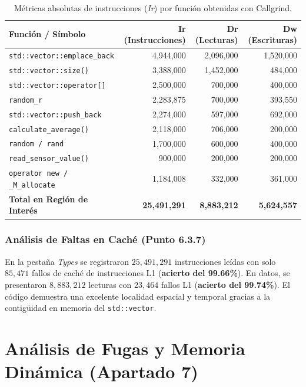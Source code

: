 \documentclass[11pt,a4paper]{article}
\begin{document}
\begin{table}[H]
\centering
\caption{Métricas absolutas de instrucciones (\textit{Ir}) por función obtenidas con Callgrind.}
\label{tab:callgrind_metrics}
\begin{tabular}{lrrr}
\toprule
\textbf{Función / Símbolo} & \textbf{Ir (Instrucciones)} & \textbf{Dr (Lecturas)} & \textbf{Dw (Escrituras)} \\ \midrule
\texttt{std::vector::emplace\_back} & 4,944,000 & 2,096,000 & 1,520,000 \\
\texttt{std::vector::size()} & 3,388,000 & 1,452,000 & 484,000 \\
\texttt{std::vector::operator[]} & 2,500,000 & 700,000 & 400,000 \\
\texttt{random\_r} & 2,283,875 & 700,000 & 393,550 \\
\texttt{std::vector::push\_back} & 2,274,000 & 597,000 & 692,000 \\
\texttt{calculate\_average()} & 2,118,000 & 706,000 & 200,000 \\
\texttt{random / rand} & 1,700,000 & 600,000 & 400,000 \\
\texttt{read\_sensor\_value()} & 900,000 & 200,000 & 200,000 \\
\texttt{operator new / \_M\_allocate} & 1,184,008 & 332,000 & 361,000 \\ \midrule
\textbf{Total en Región de Interés} & \textbf{25,491,291} & \textbf{8,883,212} & \textbf{5,624,557} \\ \bottomrule
\end{tabular}
\end{table}

\subsubsection{Análisis de Faltas en Caché (Punto 6.3.7)}
En la pestaña \textit{Types} se registraron $25{,}491{,}291$ instrucciones leídas con solo $85{,}471$ fallos de caché de instrucciones L1 (\textbf{acierto del 99.66\%}). En datos, se presentaron $8{,}883{,}212$ lecturas con $23{,}464$ fallos L1 (\textbf{acierto del 99.74\%}). El código demuestra una excelente localidad espacial y temporal gracias a la contigüidad en memoria del \texttt{std::vector}.

\section{Análisis de Fugas y Memoria Dinámica (Apartado 7)}
\end{document}
